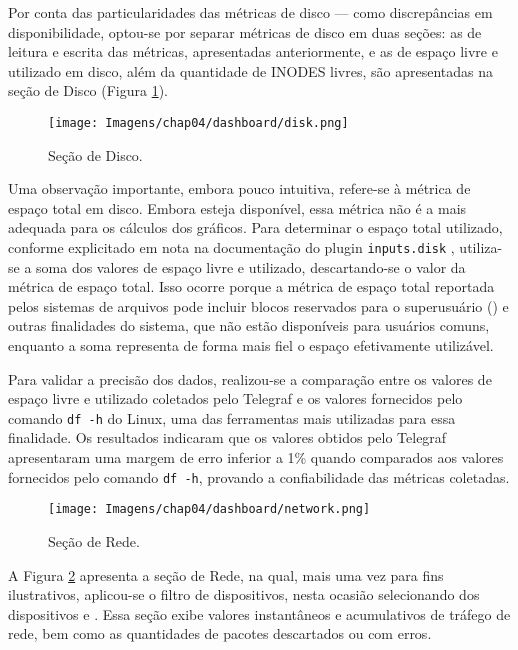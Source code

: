 Por conta das particularidades das métricas de disco --- como discrepâncias em disponibilidade, optou-se por separar métricas de disco em duas seções: as de leitura e escrita das métricas, apresentadas anteriormente, e as de espaço livre e utilizado em disco, além da quantidade de INODES livres, são apresentadas na seção de Disco (Figura \ref{fig:dashboard-disk}). 

\begin{figure}[H]
\centering
\setlength{\abovecaptionskip}{-20pt}
\texttt{[image: Imagens/chap04/dashboard/disk.png]}
\caption{Seção de Disco.}
\label{fig:dashboard-disk}
\end{figure}

Uma observação importante, embora pouco intuitiva, refere-se à métrica de espaço total em disco. Embora esteja disponível, essa métrica não é a mais adequada para os cálculos dos gráficos. Para determinar o espaço total utilizado, conforme explicitado em nota na documentação do plugin \verb|inputs.disk| \citep{inputsdisk2025}, utiliza-se a soma dos valores de espaço livre e utilizado, descartando-se o valor da métrica de espaço total. Isso ocorre porque a métrica de espaço total reportada pelos sistemas de arquivos pode incluir blocos reservados para o superusuário () e outras finalidades do sistema, que não estão disponíveis para usuários comuns, enquanto a soma  representa de forma mais fiel o espaço efetivamente utilizável.

Para validar a precisão dos dados, realizou-se a comparação entre os valores de espaço livre e utilizado coletados pelo Telegraf e os valores fornecidos pelo comando \verb|df -h| do Linux, uma das ferramentas mais utilizadas para essa finalidade. Os resultados indicaram que os valores obtidos pelo Telegraf apresentaram uma margem de erro inferior a 1\% quando comparados aos valores fornecidos pelo comando \verb|df -h|, provando a confiabilidade das métricas coletadas.

\begin{figure}[H]
\centering
\setlength{\abovecaptionskip}{-20pt}
\texttt{[image: Imagens/chap04/dashboard/network.png]}
\caption{Seção de Rede.}
\label{fig:dashboard-network}
\end{figure}

A Figura \ref{fig:dashboard-network} apresenta a seção de Rede, na qual, mais uma vez para fins ilustrativos, aplicou-se o filtro de dispositivos, nesta ocasião selecionando dos dispositivos  e . Essa seção exibe valores instantâneos e acumulativos de tráfego de rede, bem como as quantidades de pacotes descartados ou com erros.

